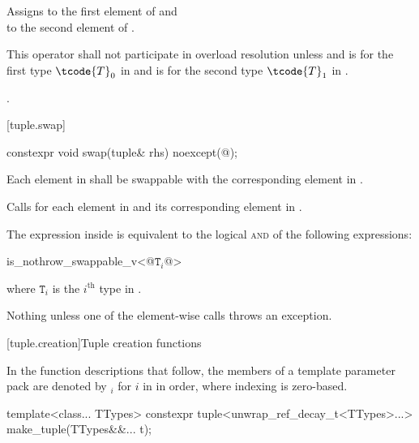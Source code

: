 \begin{itemdescr}
\pnum
\effects
Assigns  to the first
element of  and\\  to the
second element of .

\pnum
\remarks
This operator shall not participate in overload resolution unless
 and
 is  for the first type $\tcode{T}_0$ in
 and  is  for the second
type $\tcode{T}_1$ in .

\pnum
\returns
{}.
\end{itemdescr}

[tuple.swap]{}

%
\begin{itemdecl}
constexpr void swap(tuple& rhs) noexcept(@\seebelow@);
\end{itemdecl}

\begin{itemdescr}
\pnum
\requires
Each element in  shall be swappable with
the corresponding element in .

\pnum
\effects
Calls  for each element in  and its
corresponding element in .

\pnum
\remarks
The expression inside  is equivalent to the logical
\textsc{and} of the following expressions:

\begin{codeblock}
is_nothrow_swappable_v<@$\mathtt{T}_i$@>
\end{codeblock}
where $\mathtt{T}_i$ is the $i^\text{th}$ type in .

\pnum
\throws
Nothing unless one of the element-wise  calls throws an exception.
\end{itemdescr}

[tuple.creation]{Tuple creation functions}

\pnum
In the function descriptions that follow, the members of a template parameter pack 
are denoted by $_i$ for $i$ in  in
order, where indexing is zero-based.

%
%
\begin{itemdecl}
template<class... TTypes>
  constexpr tuple<unwrap_ref_decay_t<TTypes>...> make_tuple(TTypes&&... t);
\end{itemdecl}

